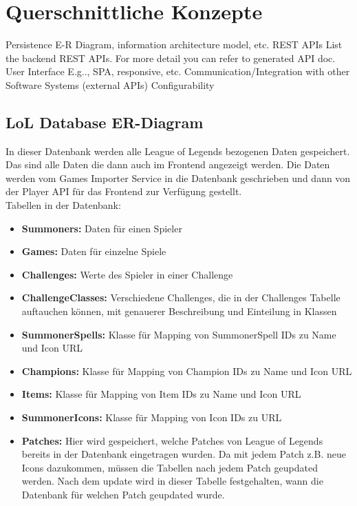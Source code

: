 \section{Querschnittliche Konzepte}
Persistence 
E-R Diagram, information architecture model, etc.
REST APIs
List the backend REST APIs. For more detail you can refer to generated API doc.
User Interface
E.g.., SPA, responsive, etc.
Communication/Integration with other Software Systems (external APIs)
Configurability

\subsection{LoL Database ER-Diagram}
In dieser Datenbank werden alle League of Legends bezogenen Daten gespeichert. Das sind alle Daten die dann auch im Frontend angezeigt werden. Die Daten werden vom Games Importer Service in die Datenbank geschrieben und dann von der Player API für das Frontend zur Verfügung gestellt.\\
Tabellen in der Datenbank:\\
\begin{itemize}
\item \textbf{Summoners:} Daten für einen Spieler
\item \textbf{Games:} Daten für einzelne Spiele
\item \textbf{Challenges:} Werte des Spieler in einer Challenge
\item \textbf{ChallengeClasses:} Verschiedene Challenges, die in der Challenges Tabelle auftauchen können, mit genauerer Beschreibung und Einteilung in Klassen
\item \textbf{SummonerSpells:} Klasse für Mapping von SummonerSpell IDs zu Name und Icon URL
\item \textbf{Champions:} Klasse für Mapping von Champion IDs zu Name und Icon URL
\item \textbf{Items:} Klasse für Mapping von Item IDs zu Name und Icon URL
\item \textbf{SummonerIcons:} Klasse für Mapping von Icon IDs zu URL
\item \textbf{Patches:} Hier wird gespeichert, welche Patches von League of Legends bereits in der Datenbank eingetragen wurden. Da mit jedem Patch z.B. neue Icons dazukommen, müssen die Tabellen nach jedem Patch geupdated werden. Nach dem update wird in dieser Tabelle festgehalten, wann die Datenbank für welchen Patch geupdated wurde.
\end{itemize}

